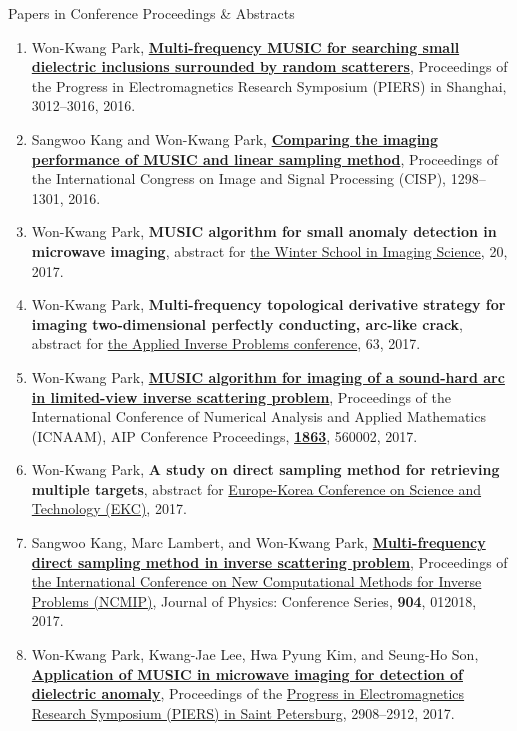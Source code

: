 \documentclass{resume} %
\begin{document}
\begin{rSection}{Papers in Conference Proceedings \& Abstracts}
\begin{enumerate}
\item\label{C-PIERS2016C} Won-Kwang Park, \href{http://dx.doi.org/10.1109/PIERS.2016.7735179}{\textbf{Multi-frequency MUSIC for searching small dielectric inclusions surrounded by random scatterers}}, Proceedings of the Progress in Electromagnetics Research Symposium (PIERS) in Shanghai, 3012--3016, 2016.
\item\label{C-CISP2016} Sangwoo Kang and Won-Kwang Park, \href{https://doi.org/10.1109/CISP-BMEI.2016.7852916}{\textbf{Comparing the imaging performance of MUSIC and linear sampling method}}, Proceedings of the  International Congress on Image and Signal Processing (CISP), 1298--1301, 2016.
\item\label{C-WSI2017} Won-Kwang Park, \textbf{MUSIC algorithm for small anomaly detection in microwave imaging}, abstract for \href{https://winterschool2017.mediviewsoft.com/}{the  Winter School in Imaging Science}, 20, 2017.
\item\label{C-AIPC2017} Won-Kwang Park, \textbf{Multi-frequency topological derivative strategy for imaging two-dimensional perfectly conducting, arc-like crack}, abstract for \href{http://aip2017.csp.escience.cn/dct/page/1}{the  Applied Inverse Problems conference}, 63, 2017.
\item\label{C-ICNAAM2017} Won-Kwang Park, \textbf{\href{http://dx.doi.org/10.1063/1.4992685}{MUSIC algorithm for imaging of a sound-hard arc in limited-view inverse scattering problem}}, Proceedings of the  International Conference of Numerical Analysis and Applied Mathematics (ICNAAM), AIP Conference Proceedings, \href{https://aip.scitation.org/toc/apc/1863/1?expanded=1863}{\textbf{1863}}, 560002, 2017.
\item\label{C-EKC2017} Won-Kwang Park, \textbf{A study on direct sampling method for retrieving multiple targets}, abstract for \href{http://www.ekc2017.org/resource/data/EKC2017-Proceedings.zip}{Europe-Korea Conference on Science and Technology (EKC)}, 2017.
\item\label{C-NCMIP2017} Sangwoo Kang, Marc Lambert, and Won-Kwang Park, \href{http://dx.doi.org/10.1088/1742-6596/904/1/012018}{\textbf{Multi-frequency direct sampling method in inverse scattering problem}}, Proceedings of \href{http://complement.farman.ens-cachan.fr/NCMIP_2017.html}{the  International Conference on New Computational Methods for Inverse Problems (NCMIP)}, Journal of Physics: Conference Series, \textbf{904}, 012018, 2017.
\item\label{C-PIERS2017B} Won-Kwang Park, Kwang-Jae Lee, Hwa Pyung Kim, and Seung-Ho Son, \href{https://doi.org/10.1109/PIERS.2017.8262251}{\textbf{Application of MUSIC in microwave imaging for detection of dielectric anomaly}}, Proceedings of the \href{http://www.piers.org/piers2017StPetersburg/}{Progress in Electromagnetics Research Symposium (PIERS) in Saint Petersburg}, 2908--2912, 2017.

\end{enumerate}
\end{rSection}
\end{document}
